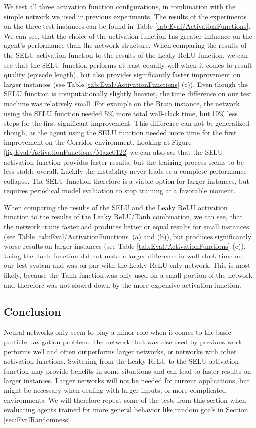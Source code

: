 We test all three activation function configurations, in combination with the simple network we used in previous experiments. The results of the experiments on the three test instances can be found in Table \ref{tab:Eval/ActivationFunctions}. We can see, that the choice of the activation function has greater influence on the agent's performance than the network structure. When comparing the results of the SELU activation function to the results of the Leaky ReLU function, we can see that the SELU function performs at least equally well when it comes to result quality (episode length), but also provides significantly faster improvement on larger instances (see Table \ref{tab:Eval/ActivationFunctions} (c)). Even though the SELU function is computationally slightly heavier, the time difference on our test machine was relatively small. For example on the Brain instance, the network using the SELU function needed 5\% more total wall-clock time, but 19\% less steps for the first significant improvement. This difference can not be generalized though, as the agent using the SELU function needed more time for the first improvement on the Corridor environment. Looking at Figure \ref{fig:Eval/ActivationFunctions/Maze0122} we can also see that the SELU activation function provides faster results, but the training process seems to be less stable overall. Luckily the instability never leads to a complete performance collapse. The SELU function therefore is a viable option for larger instances, but requires periodical model evaluation to stop training at a favorable moment.

When comparing the results of the SELU and the Leaky ReLU activation function to the results of the Leaky ReLU/Tanh combination, we can see, that the network trains faster and produces better or equal results for small instances (see Table \ref{tab:Eval/ActivationFunctions} (a) and (b)), but produces significantly worse results on larger instances (see Table \ref{tab:Eval/ActivationFunctions} (c)). Using the Tanh function did not make a larger difference in wall-clock time on our test system and was on-par with the Leaky ReLU only network. This is most likely, because the Tanh function was only used on a small portion of the network and therefore was not slowed down by the more expensive activation function.

\subsection{Conclusion} \label{sec:Eval/Networks/Conclusion}
Neural networks only seem to play a minor role when it comes to the basic particle navigation problem. The network that was also used by previous work performs well and often outperforms larger networks, or networks with other activation functions. Switching from the Leaky ReLU to the SELU activation function may provide benefits in some situations and can lead to faster results on larger instances. Larger networks will not be needed for current applications, but might be necessary when dealing with larger inputs, or more complicated environments. We will therefore repeat some of the tests from this section when evaluating agents trained for more general behavior like random goals in Section \ref{sec:EvalRandomness}. 

